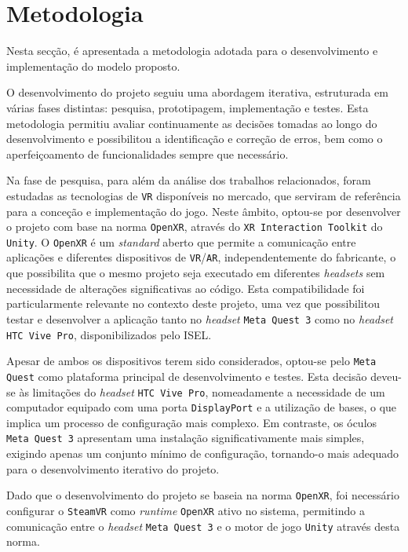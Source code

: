 \documentclass[a4paper, 12pt]{book}
\begin{document}
\section{Metodologia}\label{sec:metodologia}

Nesta secção, é apresentada a metodologia adotada para o desenvolvimento
e implementação do modelo proposto.

O desenvolvimento do projeto seguiu uma abordagem iterativa, estruturada em 
várias fases distintas: pesquisa, prototipagem, implementação e testes. 
Esta metodologia permitiu avaliar continuamente as decisões tomadas ao longo 
do desenvolvimento e possibilitou a identificação e correção de erros, bem como o 
aperfeiçoamento de funcionalidades sempre que necessário.

Na fase de pesquisa, para além da análise dos trabalhos relacionados, foram estudadas 
as tecnologias de \texttt{VR} disponíveis no mercado, que serviram de referência para a 
conceção e implementação do jogo. Neste âmbito, optou-se por desenvolver o projeto com 
base na norma \texttt{OpenXR}, através do \texttt{XR Interaction Toolkit} do \texttt{Unity}. O 
\texttt{OpenXR} é um \textit{standard} aberto que permite a comunicação entre aplicações 
e diferentes dispositivos de \texttt{VR}/\texttt{AR}, independentemente do fabricante, o que 
possibilita que o mesmo projeto seja executado em diferentes \textit{headsets} 
sem necessidade de alterações significativas ao código. Esta compatibilidade foi 
particularmente relevante no contexto deste projeto, uma vez que possibilitou testar 
e desenvolver a aplicação tanto no \textit{headset} \texttt{Meta Quest 3} como no \textit{headset} \texttt{HTC Vive Pro}, 
disponibilizados pelo ISEL.

Apesar de ambos os dispositivos terem sido considerados, optou-se pelo \texttt{Meta Quest} 
como plataforma principal de desenvolvimento e testes. Esta decisão deveu-se às 
limitações do \textit{headset} \texttt{HTC Vive Pro}, nomeadamente a necessidade de um computador equipado com 
uma porta \texttt{DisplayPort} e a utilização de bases, o que implica um processo de 
configuração mais complexo. Em contraste, os óculos \texttt{Meta Quest 3} apresentam uma instalação 
significativamente mais simples, exigindo apenas um conjunto mínimo de configuração, 
tornando-o mais adequado para o desenvolvimento iterativo do projeto.

Dado que o desenvolvimento do projeto se baseia na norma \texttt{OpenXR}, foi 
necessário configurar o \texttt{SteamVR} como \textit{runtime} \texttt{OpenXR} 
ativo no sistema, permitindo a comunicação entre o \textit{headset} \texttt{Meta Quest 3} e o 
motor de jogo \texttt{Unity} através desta norma.
\end{document}
